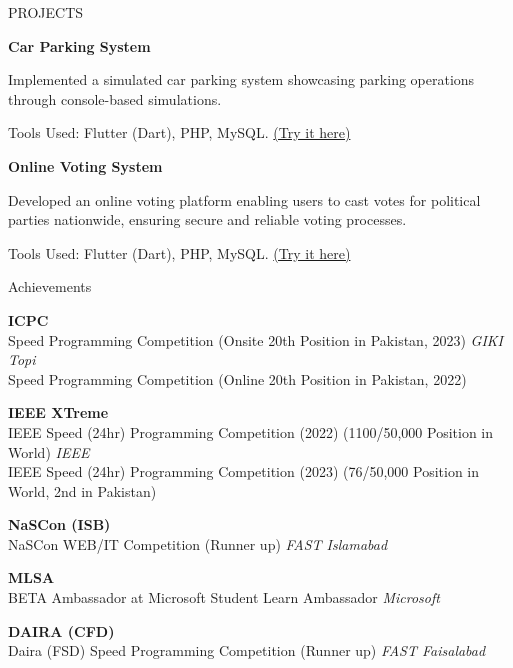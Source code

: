\documentclass{resume}
\begin{document}
\begin{rSection}{PROJECTS}
\item \textbf{Car Parking System} \itemsep -3pt {} 
     \item {Implemented a simulated car parking system showcasing parking operations through console-based simulations.}
     \item Tools Used: Flutter (Dart), PHP, MySQL.
     \href{https://github.com/GurusGeek/CAR-PARKING_SYSTEM}{(Try it here)}

\item \textbf{Online Voting System} \itemsep -3pt {} 
     \item {Developed an online voting platform enabling users to cast votes for political parties nationwide, ensuring secure and reliable voting processes.}
     \item Tools Used: Flutter (Dart), PHP, MySQL.
     \href{https://github.com/GurusGeek/online-voting-system}{(Try it here)}

\end{rSection}



\begin{rSection}{Achievements} 

\textbf{ICPC} \\
Speed Programming Competition (Onsite 20th Position in Pakistan, 2023) \hfill \textit{GIKI Topi} \\
Speed Programming Competition (Online 20th Position in Pakistan, 2022)

\textbf{IEEE XTreme} \\
IEEE Speed (24hr) Programming Competition (2022) (1100/50,000 Position in World) \hfill \textit{IEEE} \\
IEEE Speed (24hr) Programming Competition (2023) (76/50,000 Position in World, 2nd in Pakistan)

\textbf{NaSCon (ISB)} \\
NaSCon WEB/IT Competition (Runner up) \hfill \textit{FAST Islamabad}

\textbf{MLSA} \\
BETA Ambassador at Microsoft Student Learn Ambassador \hfill \textit{Microsoft}

\textbf{DAIRA (CFD)} \\
Daira (FSD) Speed Programming Competition (Runner up) \hfill \textit{FAST Faisalabad}

\end{rSection}
\end{document}
